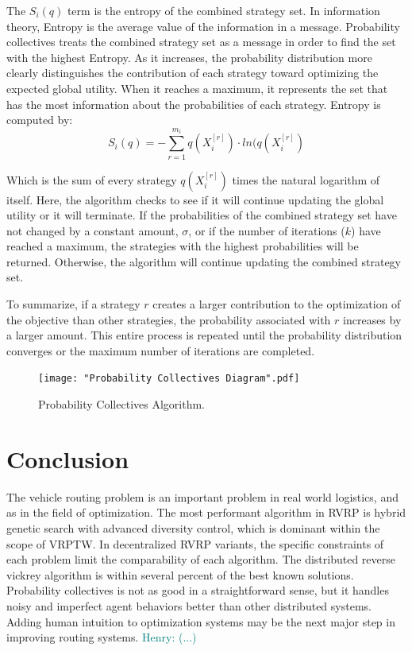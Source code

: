 \documentclass{sig-alternate}
\newcommand{\allcomments}[1]{{#1}}
\newcommand{\hfcomment}[1]{\textcolor{Teal}{\allcomments{Henry: {#1}}}}
\begin{document}
{The $S_i(q)$ term is the entropy of the combined strategy set. In information theory, Entropy is the average value of the information in a message. Probability collectives treats the combined strategy set as a message in order to find the set with the highest Entropy. As it increases, the probability distribution more clearly distinguishes the contribution of each strategy toward optimizing the expected global utility. When it reaches a maximum, it represents the set that has the most information about the probabilities of each strategy. Entropy is computed by:
	\begin{equation}
	S_i(q)=-\sum_{r=1}^{m_i}q(X_i^{[r]})\cdot ln(q(X_i^{[r]})
	\end{equation}
	
Which is the sum of every strategy $q(X_i^{[r]})$ times the natural logarithm of itself. Here, the algorithm checks to see if it will continue updating the global utility or it will terminate. If the probabilities of the combined strategy set have not changed by a constant amount, $\sigma$, or if the number of iterations ($k$) have reached a maximum, the strategies with the highest probabilities will be returned. Otherwise, the algorithm will continue updating the combined strategy set.

To summarize, if a strategy $r$ creates a larger contribution to the optimization of the objective than other strategies, the probability associated with $r$ increases by a larger amount. This entire process is repeated until the probability distribution converges or the maximum number of iterations are completed. 

\begin{figure}
\centering
\texttt{[image: "Probability Collectives Diagram".pdf]}
\caption{Probability Collectives Algorithm.}
\label{fig:PCDiagram}
\end{figure}


\section{Conclusion}
\label{conclusion}
The vehicle routing problem is an important problem in real world logistics, and as in the field of optimization. The most performant algorithm in RVRP is hybrid genetic search with advanced diversity control, which is dominant within the scope of VRPTW. In decentralized RVRP variants, the specific constraints of each problem limit the comparability of each algorithm. The distributed reverse vickrey algorithm is within several percent of the best known solutions. Probability collectives is not as good in a straightforward sense, but it handles noisy and imperfect agent behaviors better than other distributed systems. 
Adding human intuition to optimization systems may be the next major step in improving routing systems. \hfcomment{(...)}
}
\end{document}
